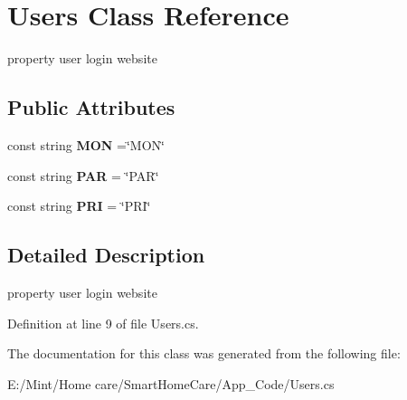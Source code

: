 \hypertarget{class_users}{\section{Users Class Reference}
\label{class_users}
}


property user login website  


\subsection*{Public Attributes}
\begin{DoxyCompactItemize}
\item 
\hypertarget{class_users_af916b787a91eacd25ce0bc12715569ca}{const string {\bfseries M\-O\-N} =\char`\"{}M\-O\-N\char`\"{}}\label{class_users_af916b787a91eacd25ce0bc12715569ca}

\item 
\hypertarget{class_users_a699fc73d2ed83b3cacb51fe85aa72db9}{const string {\bfseries P\-A\-R} = \char`\"{}P\-A\-R\char`\"{}}\label{class_users_a699fc73d2ed83b3cacb51fe85aa72db9}

\item 
\hypertarget{class_users_a118d2f4312f279dc03af9e6a2406b3a1}{const string {\bfseries P\-R\-I} = \char`\"{}P\-R\-I\char`\"{}}\label{class_users_a118d2f4312f279dc03af9e6a2406b3a1}

\end{DoxyCompactItemize}


\subsection{Detailed Description}
property user login website 

Definition at line 9 of file Users.\-cs.



The documentation for this class was generated from the following file\-:\begin{DoxyCompactItemize}
\item 
E\-:/\-Mint/\-Home care/\-Smart\-Home\-Care/\-App\-\_\-\-Code/Users.\-cs\end{DoxyCompactItemize}
